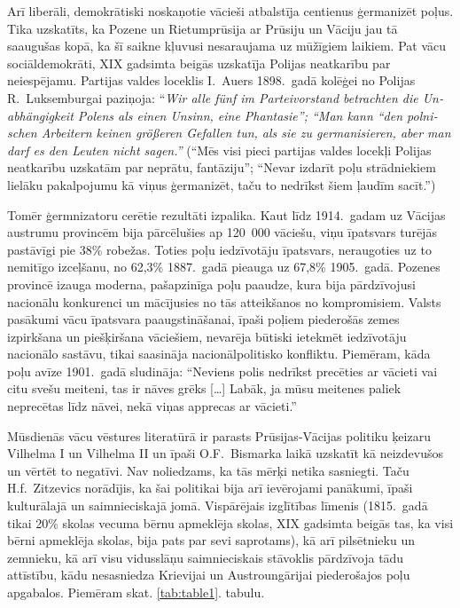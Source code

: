 \documentclass[twoside,a5paper,12pt,fleqn,openany]{extbook}
\newcommand{\detxti}[1]{\textit{\textgerman{#1}}}
\newcommand{\citespace}{[\dots{}]}
\begin{document}
Arī liberāli, demokrātiski noskaņotie vācieši atbalstīja centienus ģermanizēt poļus. Tika uzskatīts, ka Pozene un Rietumprūsija ar Prūsiju un Vāciju jau tā saaugušas kopā, ka šī saikne kļuvusi nesaraujama uz mūžīgiem laikiem. Pat vācu sociāldemokrāti, XIX gadsimta beigās uzskatīja Polijas neatkarību par neiespējamu. Partijas valdes loceklis I.~Auers 1898.~gadā kolēģei no Polijas R.~Luksemburgai paziņoja: ``\detxti{Wir alle fünf im Parteivorstand betrachten die Unabhängigkeit Polens als einen Unsinn, eine Phantasie''; ``Man kann ``den polnischen Arbeitern keinen größeren Gefallen tun, als sie zu germanisieren, aber man darf es den Leuten nicht sagen.''} (``Mēs visi pieci partijas valdes locekļi Polijas neatkarību uzskatām par neprātu, fantāziju''; ``Nevar izdarīt poļu strādniekiem lielāku pakalpojumu kā viņus ģermanizēt, taču to nedrīkst šiem ļaudīm sacīt.'')

Tomēr ģermnizatoru cerētie rezultāti izpalika. Kaut līdz 1914.~gadam uz Vācijas austrumu provincēm bija pārcēlušies ap 120~000 vāciešu, viņu īpatsvars turējās pastāvīgi pie 38\% robežas. Toties poļu iedzīvotāju īpatsvars, neraugoties uz to nemitīgo izceļšanu, no 62,3\% 1887.~gadā pieauga uz 67,8\% 1905.~gadā. Pozenes provincē izauga moderna, pašapzinīga poļu paaudze, kura bija pārdzīvojusi nacionālu konkurenci un mācījusies no tās atteikšanos no kompromisiem. Valsts pasākumi vācu īpatsvara paaugstināšanai, īpaši poļiem piederošās zemes izpirkšana un piešķiršana vāciešiem, nevarēja būtiski ietekmēt iedzīvotāju nacionālo sastāvu, tikai saasināja nacionālpolitisko konfliktu. Piemēram, kāda poļu avīze 1901.~gadā sludināja: ``Neviens polis nedrīkst precēties ar vācieti vai citu svešu meiteni, tas ir nāves grēks \citespace{} Labāk, ja mūsu meitenes paliek neprecētas līdz nāvei, nekā viņas apprecas ar vācieti.''

Mūsdienās vācu vēstures literatūrā ir parasts Prūsijas-Vācijas politiku ķeizaru Vilhelma I un Vilhelma II un īpaši O.F.~Bismarka laikā uzskatīt kā neizdevušos un vērtēt to negatīvi. Nav noliedzams, ka tās mērķi netika sasniegti. Taču H.f.~Zitzevics norādījis, ka šai politikai bija arī ievērojami panākumi, īpaši kulturālajā un saimnieciskajā jomā. Vispārējais izglītības līmenis (1815.~gadā tikai 20\% skolas vecuma bērnu apmeklēja skolas, XIX gadsimta beigās tas, ka visi bērni apmeklēja skolas, bija pats par sevi saprotams), kā arī pilsētnieku un zemnieku, kā arī visu vidusslāņu saimnieciskais stāvoklis pārdzīvoja tādu attīstību, kādu nesasniedza Krievijai un Austroungārijai piederošajos poļu apgabalos. Piemēram skat. \ref{tab:table1}. tabulu.
\end{document}
